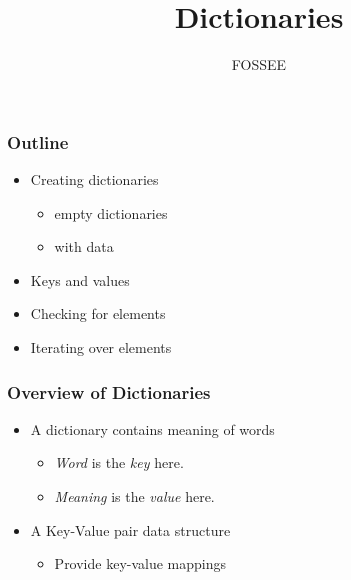\documentclass[presentation]{beamer}
\title{Dictionaries}
\author{FOSSEE}
\date{}
\begin{document}
\maketitle









\begin{frame}
\frametitle{Outline}
\label{sec-1}

\begin{itemize}
\item Creating dictionaries

\begin{itemize}
\item empty dictionaries
\item with data
\end{itemize}

\item Keys and values
\item Checking for elements
\item Iterating over elements
\end{itemize}
\end{frame}
\begin{frame}
\frametitle{Overview of Dictionaries}
\label{sec-2}

\begin{itemize}
\item A dictionary contains meaning of words

\begin{itemize}
\item \emph{Word} is the \emph{key} here.
\item \emph{Meaning} is the \emph{value} here.
\end{itemize}

\item A Key-Value pair data structure

\begin{itemize}
\item Provide key-value mappings
\end{itemize}

\end{itemize}
\end{frame}
\end{document}
